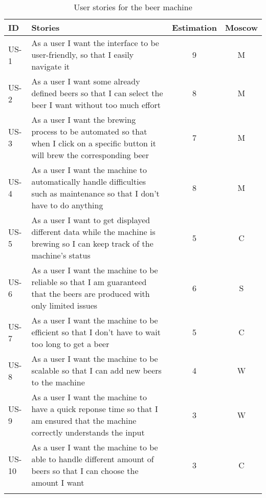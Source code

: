 \begin{table}[H]
    \begin{center}
        \sloppy
        \begin{longtable}{|p{1cm}|p{11cm}|c|c|}
            \hline
            ID    & Stories                                                                                                                                    & Estimation & Moscow \\ \hline
            US-1  & As a user I want the interface to be user-friendly, so that I easily navigate it                                                           & 9          & M      \\ \hline
            US-2  & As a user I want some already defined beers so that I can select the beer I want without too much effort                                   & 8          & M      \\ \hline
            US-3  & As a user I want the brewing process to be automated so that when I click on a specific button it will brew the corresponding beer         & 7          & M      \\ \hline
            US-4  & As a user I want the machine to automatically handle difficulties such as maintenance so that I don't have to do anything                  & 8          & M      \\ \hline
            US-5  & As a user I want to get displayed different data while the machine is brewing so I can keep track of the machine's status                  & 5          & C      \\ \hline
            US-6  & As a user I want the machine to be reliable so that I am guaranteed that the beers are produced with only limited issues                   & 6          & S      \\ \hline
            US-7  & As a user I want the machine to be efficient so that I don't have to wait too long to get a beer                                           & 5          & C      \\ \hline
            US-8  & As a user I want the machine to be scalable so that I can add new beers to the machine                                                     & 4          & W      \\ \hline
            US-9  & As a user I want the machine to have a quick reponse time so that I am ensured that the machine correctly understands the input            & 3          & W      \\ \hline
            US-10 & As a user I want the machine to be able to handle different amount of beers so that I can choose the amount I want                         & 3          & C      \\ \hline

            \caption{User stories for the beer machine}
            \label{tab:user_stories}
        \end{longtable}
    \end{center}
\end{table}